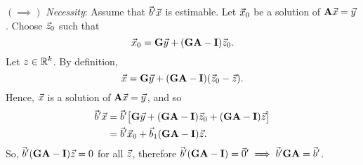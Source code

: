 \begin{Theorem}{}{}
    $ (\implies) $ \emph{Necessity}: Assume that $ \vec{b}'\vec{x} $ is estimable. Let $ \vec{x}_0 $ be a solution
    of $ \mathbf{A}\vec{x}=\vec{y} $. Choose $ \vec{z}_0 $ such that
    \[ \vec{x}_0=\mathbf{G}\vec{y}+(\mathbf{GA}-\mathbf{I})\vec{z}_0. \]
    Let $ z\in\mathbb{R}^{k} $. By definition,
    \[ \vec{x}=\mathbf{G}\vec{y}+(\mathbf{GA}-\mathbf{I})(\vec{z}_0-\vec{z}). \]
    Hence, $ \vec{x} $ is a solution of $ \mathbf{A}\vec{x}=\vec{y} $, and so
    \begin{align*}
        \vec{b}'\vec{x}
         & =\vec{b}'\bigl[\mathbf{G}\vec{y}+(\mathbf{GA}-\mathbf{I})\vec{z}_0+(\mathbf{GA}-\mathbf{I})\vec{z}\bigr] \\
         & =\vec{b}'\vec{x}_0+\vec{b}_1(\mathbf{GA}-\mathbf{I})\vec{z}.
    \end{align*}
    So, $ \vec{b}'(\mathbf{GA}-\mathbf{I})\vec{z}=0 $ for all $ \vec{z} $,
    therefore $ \vec{b}'(\mathbf{GA}-\mathbf{I})=\vec{0}'\implies \vec{b}'\mathbf{GA}=\vec{b}' $.
\end{Theorem}

